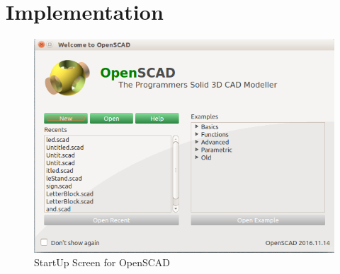\section{Implementation}
\begin{figure}[H]
    \centering \includegraphics[width=0.7\linewidth]{images/output/1.png}
    \caption{StartUp Screen for OpenSCAD}
    \label{fig:1}
\end{figure}
